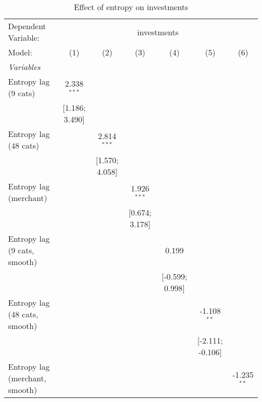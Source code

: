 
\begin{table}[htbp]
   \centering
   \tiny
   \begin{threeparttable}[b]
      \caption{\label{tab:reg_investments_lag} Effect of entropy on investments}
      \begin{tabular}{lcccccc}
         \tabularnewline \midrule \midrule
         Dependent Variable: & \multicolumn{6}{c}{investments}\\
         Model:                         & (1)             & (2)             & (3)             & (4)             & (5)              & (6)\\  
         \midrule
         \emph{Variables}\\
         Entropy lag (9 cats)           & 2.338$^{***}$   &                 &                 &                 &                  &   \\   
                                        & [1.186; 3.490]  &                 &                 &                 &                  &   \\   
         Entropy lag (48 cats)          &                 & 2.814$^{***}$   &                 &                 &                  &   \\   
                                        &                 & [1.570; 4.058]  &                 &                 &                  &   \\   
         Entropy lag (merchant)         &                 &                 & 1.926$^{***}$   &                 &                  &   \\   
                                        &                 &                 & [0.674; 3.178]  &                 &                  &   \\   
         Entropy lag (9 cats, smooth)   &                 &                 &                 & 0.199           &                  &   \\   
                                        &                 &                 &                 & [-0.599; 0.998] &                  &   \\   
         Entropy lag (48 cats, smooth)  &                 &                 &                 &                 & -1.108$^{**}$    &   \\   
                                        &                 &                 &                 &                 & [-2.111; -0.106] &   \\   
         Entropy lag (merchant, smooth) &                 &                 &                 &                 &                  & -1.235$^{**}$\\   

\end{tabular}
\end{threeparttable}
\end{table}

